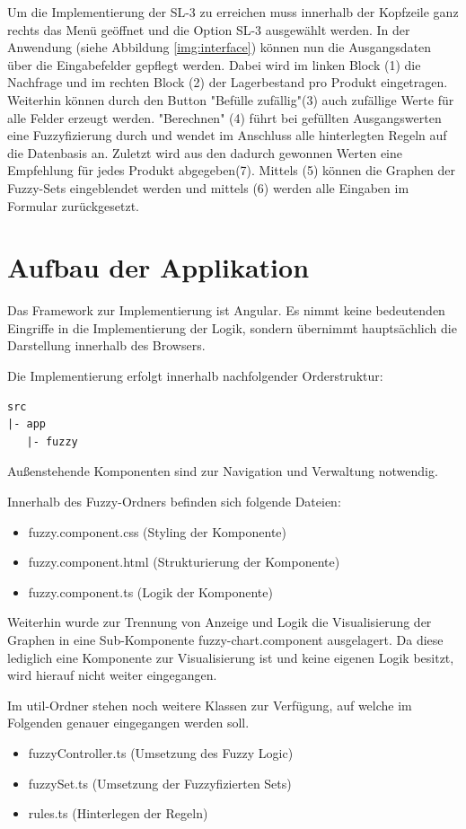 \documentclass[]{scrartcl}
\begin{document}
Um die Implementierung der SL-3 zu erreichen muss innerhalb der Kopfzeile ganz rechts das Menü geöffnet und die Option SL-3 ausgewählt werden. In der Anwendung (siehe Abbildung \ref{img:interface}) können nun die Ausgangsdaten über die Eingabefelder gepflegt werden. Dabei wird im linken Block (1) die Nachfrage und im rechten Block (2) der Lagerbestand pro Produkt eingetragen. Weiterhin können durch den Button "Befülle zufällig"(3) auch zufällige Werte für alle Felder erzeugt werden. "Berechnen" (4) führt bei gefüllten Ausgangswerten eine Fuzzyfizierung durch und wendet im Anschluss alle hinterlegten Regeln auf die Datenbasis an. Zuletzt wird aus den dadurch gewonnen Werten eine Empfehlung für jedes Produkt abgegeben(7). Mittels (5) können die Graphen der Fuzzy-Sets eingeblendet werden und mittels (6) werden alle Eingaben im Formular zurückgesetzt.

\section{Aufbau der Applikation}
\label{aufbau}
Das Framework zur Implementierung ist Angular. Es nimmt keine bedeutenden Eingriffe in die Implementierung der Logik, sondern übernimmt hauptsächlich die Darstellung innerhalb des Browsers.


Die Implementierung erfolgt innerhalb nachfolgender Orderstruktur:
\begin{lstlisting}[backgroundcolor=\color{lightgray}]
src
|- app
   |- fuzzy
\end{lstlisting}
Außenstehende Komponenten sind zur Navigation und Verwaltung notwendig.

Innerhalb des Fuzzy-Ordners befinden sich folgende Dateien:
\begin{itemize}
\item fuzzy.component.css (Styling der Komponente)
\item fuzzy.component.html (Strukturierung der Komponente)
\item fuzzy.component.ts (Logik der Komponente)
\end{itemize}

Weiterhin wurde zur Trennung von Anzeige und Logik die Visualisierung der Graphen in eine Sub-Komponente fuzzy-chart.component ausgelagert. Da diese lediglich eine Komponente zur Visualisierung ist und keine eigenen Logik besitzt, wird hierauf nicht weiter eingegangen.

Im util-Ordner stehen noch weitere Klassen zur Verfügung, auf welche im Folgenden genauer eingegangen werden soll.
\begin{itemize}
	\item fuzzyController.ts (Umsetzung des Fuzzy Logic)
	\item fuzzySet.ts (Umsetzung der Fuzzyfizierten Sets)
	\item rules.ts (Hinterlegen der Regeln)
\end{itemize}
\end{document}
